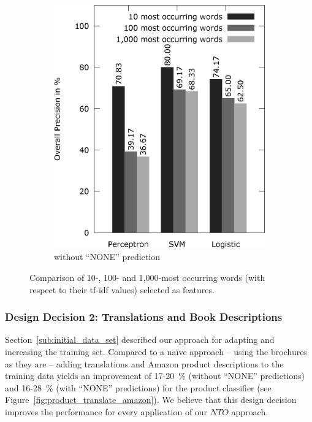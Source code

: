\begin{figure}[h!]
\begin{subfigure}[t]{0.5\textwidth}
		\includegraphics[width=\textwidth]{figures/product_feature_selection_without_none.eps}
		\caption{without ``NONE'' prediction}
	\end{subfigure}
	\caption{Comparison of 10-, 100- and 1,000-most occurring words (with respect to their tf-idf values) selected as features.}
	\label{fig:product_feature_selection}
\end{figure}

\subsubsection{Design Decision 2: Translations and Book Descriptions}
Section~\ref{sub:initial_data_set} described our approach for adapting and increasing the training set.
Compared to a na\"ive approach -- using the brochures as they are -- adding translations and Amazon product descriptions to the training data yields an improvement of 17-20~\% (without ``NONE'' predictions) and 16-28~\% (with ``NONE'' predictions) for the product classifier (see Figure~\ref{fig:product_translate_amazon}).
We believe that this design decision improves the performance for every application of our $NTO$ approach.

